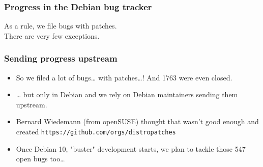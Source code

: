 \documentclass[14pt,aspectratio=169]{beamer}
\begin{document}
\begin{frame}
 \frametitle{Progress in the Debian bug tracker}
 \begin{center}
  \footnotesize{As a rule, we file bugs with patches. \\
  There are very few exceptions.}
  \vfill
 \end{center}
\end{frame}

\begin{frame}
 \frametitle{Sending progress upstream}
 \begin{itemize}
 \item So we filed a lot of bugs… with patches…! And 1763 were even closed.
 \item … but only in Debian and we rely on Debian maintainers sending them
 upstream.
 \item<2-3> Bernard Wiedemann (from openSUSE) thought that wasn't good enough
 and created \texttt{https://github.com/orgs/distropatches}
 \item<3> Once Debian 10, "buster" development starts, we plan to tackle those 547 open bugs too…
 \end{itemize}
\end{frame}
\end{document}
